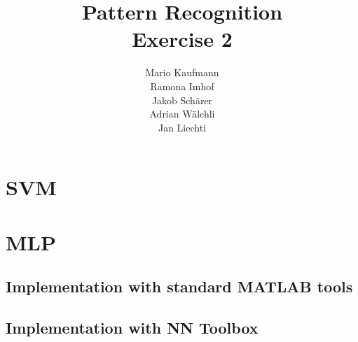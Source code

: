 \documentclass[a4paper]{article}
\title{Pattern Recognition\\Exercise 2}
\author{Mario Kaufmann \\ Ramona Imhof \\ Jakob Sch\"arer \\ Adrian W\"alchli \\ Jan Liechti}
\begin{document}
\maketitle

\section{SVM}

\section{MLP}

\subsection{Implementation with standard MATLAB tools}

\subsection{Implementation with NN Toolbox}
%
%
%
%




\end{document}
